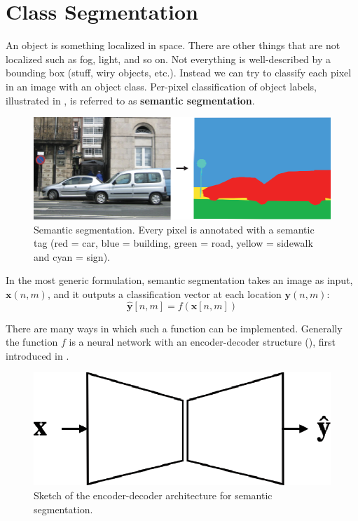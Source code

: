 \section{Class Segmentation}

An object is something localized in space. There are other things that are not localized such as fog, light, and so on. Not everything is well-described by a bounding box (stuff, wiry objects, etc.). Instead we can try to classify each pixel in an image with an object class. Per-pixel classification of object labels, illustrated in \fig{\ref{fig:semantic_class_segmentation}}, is referred to as {\bf semantic segmentation}.


\begin{figure}
    \centerline{
        \includegraphics[width=0.6\linewidth]{figures/object_recognition/semantic.eps}
    }
    \caption{Semantic segmentation. Every pixel is annotated with a semantic tag (red = car, blue = building, green = road, yellow = sidewalk and cyan = sign).}
    \label{fig:semantic_class_segmentation}
\end{figure}

In the most generic formulation, semantic segmentation takes an image as input, $\mathbf{x}(n,m)$, and it outputs a classification vector at each location $\mathbf{y}(n,m)$:
\begin{equation}
    \hat{\mathbf{y}} \left[n,m \right] = f(\mathbf{x} \left[n,m \right])
\end{equation}



There are many ways in which such a function can be implemented. Generally the function $f$ is a neural network with an encoder-decoder structure (\fig{\ref{fig:segmentation_architecture}}), first introduced in \cite{Badrinarayanan2015}.

\begin{figure}
    \centerline{
        \includegraphics[width=0.3\linewidth]{figures/object_recognition/segmentation_architecture.eps}
    }
    \caption{Sketch of the encoder-decoder architecture for semantic segmentation.}
    \label{fig:segmentation_architecture}
\end{figure}

